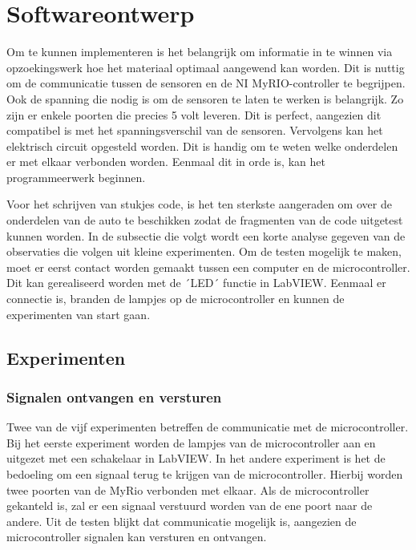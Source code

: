 \documentclass[a4paper,twoside,kulak]{kulakreport} %
\begin{document}
\section{Softwareontwerp}\label{Softwareontwerp}

Om te kunnen implementeren is het belangrijk om informatie in te winnen via opzoekingswerk hoe het materiaal optimaal aangewend kan worden.
Dit is nuttig om de communicatie tussen de sensoren en de NI MyRIO-controller te begrijpen. Ook de spanning die nodig is om de sensoren te laten te werken is belangrijk. Zo zijn er enkele poorten die precies 5 volt leveren. Dit is perfect, aangezien dit compatibel is met het spanningsverschil van de sensoren. Vervolgens kan het elektrisch circuit opgesteld worden. Dit is handig om te weten welke onderdelen er met elkaar verbonden worden. Eenmaal dit in orde is, kan het programmeerwerk beginnen.

Voor het schrijven van stukjes code, is het ten sterkste aangeraden om over de onderdelen van de auto te beschikken zodat de fragmenten van de code uitgetest kunnen worden. In de subsectie die volgt wordt een korte analyse gegeven van de observaties die volgen uit kleine experimenten. Om de testen mogelijk te maken, moet er eerst contact worden gemaakt tussen een computer en de microcontroller. Dit kan gerealiseerd worden met de ´LED´ functie in LabVIEW. Eenmaal er connectie is, branden de lampjes op de microcontroller en kunnen de experimenten van start gaan.


\subsection{Experimenten}
\subsubsection{Signalen ontvangen en versturen}
Twee van de vijf experimenten betreffen de communicatie met de microcontroller. 
Bij het eerste experiment worden de lampjes van de microcontroller aan en uitgezet met een schakelaar in LabVIEW.
In het andere experiment is het de bedoeling om een signaal terug te krijgen van de microcontroller.
Hierbij worden twee poorten van de MyRio verbonden met elkaar. Als de microcontroller gekanteld is, zal er een signaal verstuurd worden van de ene poort naar de andere.
Uit de testen blijkt dat communicatie mogelijk is, aangezien de microcontroller signalen kan versturen en ontvangen.
\end{document}
